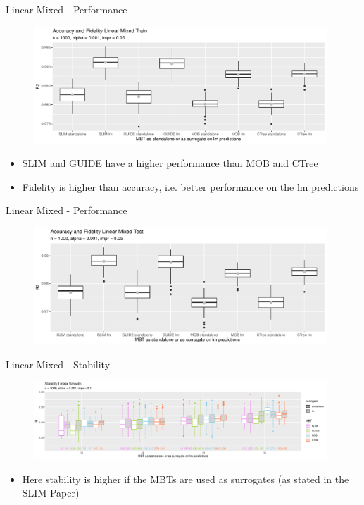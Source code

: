 \documentclass[9pt, xcolor=table]{beamer}
\begin{document}
\begin{frame}{Linear Mixed - Performance}

\begin{figure}
    \includegraphics[width=11cm]{Figures/simulations/batchtools/basic_scenarios/linear_mixed/lm_1000_standalone_lm_r2_train.pdf}
\end{figure}  
\begin{itemize}
    \item SLIM and GUIDE have a higher performance than MOB and CTree
    \item Fidelity is higher than accuracy, i.e. better performance on the lm predictions
\end{itemize}
\end{frame}

\begin{frame}{Linear Mixed - Performance}

\begin{figure}
    \includegraphics[width=11cm]{Figures/simulations/batchtools/basic_scenarios/linear_mixed/lm_1000_standalone_lm_r2_test.pdf}
\end{figure}  

\end{frame}

\begin{frame}{Linear Mixed - Stability}

\begin{figure}
    \includegraphics[width=11cm]{Figures/simulations/batchtools/basic_scenarios/linear_mixed/lm_1000_standalone_lm_sta.pdf}
\end{figure}     
\begin{itemize}
    \item Here stability is higher if the MBTs are used as surrogates (as stated in the SLIM Paper)
\end{itemize}

\end{frame}
\end{document}
